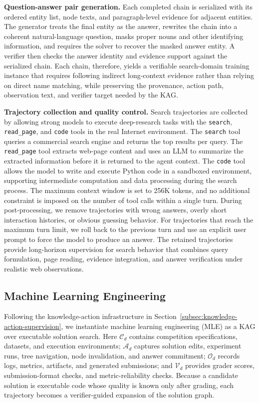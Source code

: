 \documentclass{llmxive}
\begin{document}
\textbf{Question-answer pair generation.} Each completed chain is serialized with its ordered entity list, node texts, and paragraph-level evidence for adjacent entities. The generator treats the final entity as the answer, rewrites the chain into a coherent natural-language question, masks proper nouns and other identifying information, and requires the solver to recover the masked answer entity. A verifier then checks the answer identity and evidence support against the serialized chain. Each chain, therefore, yields a verifiable search-domain training instance that requires following indirect long-context evidence rather than relying on direct name matching, while preserving the provenance, action path, observation text, and verifier target needed by the KAG.

\textbf{Trajectory collection and quality control.} Search trajectories are collected by allowing strong models to execute deep-research tasks with the \texttt{search}, \texttt{read\_page}, and \texttt{code} tools in the real Internet environment. The \texttt{search} tool queries a commercial search engine and returns the top results per query. The \texttt{read\_page} tool extracts web-page content and uses an LLM to summarize the extracted information before it is returned to the agent context. The \texttt{code} tool allows the model to write and execute Python code in a sandboxed environment, supporting intermediate computation and data processing during the search process. The maximum context window is set to 256K tokens, and no additional constraint is imposed on the number of tool calls within a single turn. During post-processing, we remove trajectories with wrong answers, overly short interaction histories, or obvious guessing behavior. For trajectories that reach the maximum turn limit, we roll back to the previous turn and use an explicit user prompt to force the model to produce an answer. The retained trajectories provide long-horizon supervision for search behavior that combines query formulation, page reading, evidence integration, and answer verification under realistic web observations.


\subsection{Machine Learning Engineering}
\label{sec:mle_data_pipeline}
Following the knowledge-action infrastructure in Section~\ref{subsec:knowledge-action-supervision}, we instantiate machine learning engineering (MLE) as a KAG over executable solution search. Here $\mathcal{C}_d$ contains competition specifications, datasets, and execution environments; $\mathcal{A}_d$ captures solution edits, experiment runs, tree navigation, node invalidation, and answer commitment; $\mathcal{O}_d$ records logs, metrics, artifacts, and generated submissions; and $\mathcal{V}_d$ provides grader scores, submission-format checks, and metric-reliability checks. Because a candidate solution is executable code whose quality is known only after grading, each trajectory becomes a verifier-guided expansion of the solution graph.
\end{document}
